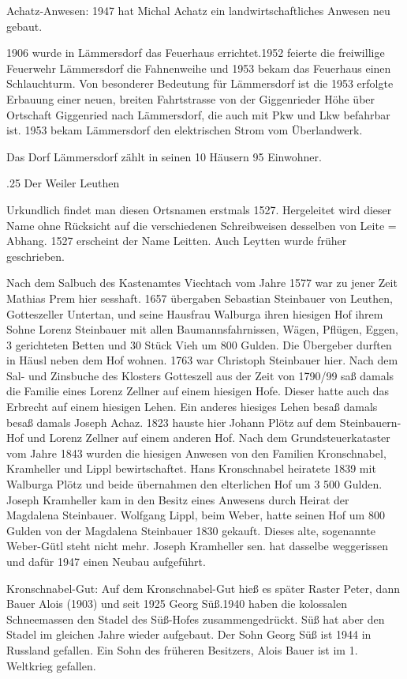 \documentclass{book}
\begin{document}
Achatz-Anwesen: 1947 hat Michal Achatz ein landwirtschaftliches Anwesen neu
gebaut.

1906 wurde in Lämmersdorf das Feuerhaus errichtet.1952 feierte die freiwillige
Feuerwehr Lämmersdorf die Fahnenweihe und 1953 bekam das Feuerhaus einen
Schlauchturm. Von besonderer Bedeutung für Lämmersdorf ist die 1953 erfolgte
Erbauung einer neuen, breiten Fahrtstrasse von der Giggenrieder Höhe über
Ortschaft Giggenried nach Lämmersdorf, die auch mit Pkw und Lkw befahrbar ist.
1953 bekam Lämmersdorf den elektrischen Strom vom Überlandwerk.

Das Dorf Lämmersdorf zählt in seinen 10 Häusern 95 Einwohner.

.25 Der Weiler Leuthen

Urkundlich findet man diesen Ortsnamen erstmals 1527. Hergeleitet wird dieser
Name ohne Rücksicht auf die verschiedenen Schreibweisen desselben von Leite =
Abhang. 1527 erscheint der Name Leitten. Auch Leytten wurde früher geschrieben.

Nach dem Salbuch des Kastenamtes Viechtach vom Jahre 1577 war zu jener Zeit
Mathias Prem hier sesshaft. 1657 übergaben Sebastian Steinbauer von Leuthen,
Gotteszeller Untertan, und seine Hausfrau Walburga ihren hiesigen Hof ihrem
Sohne Lorenz Steinbauer mit allen Baumannsfahrnissen, Wägen, Pflügen, Eggen, 3
gerichteten Betten und 30 Stück Vieh um 800 Gulden. Die Übergeber durften in
Häusl neben dem Hof wohnen. 1763 war Christoph Steinbauer hier. Nach dem Sal-
und Zinsbuche des Klosters Gotteszell aus der Zeit von 1790/99 saß damals die
Familie eines Lorenz Zellner auf einem hiesigen Hofe. Dieser hatte auch das
Erbrecht auf einem hiesigen Lehen. Ein anderes hiesiges Lehen besaß damals besaß
damals Joseph Achaz. 1823 hauste hier Johann Plötz auf dem Steinbauern-Hof und
Lorenz Zellner auf einem anderen Hof. Nach dem Grundsteuerkataster vom Jahre
1843 wurden die hiesigen Anwesen von den Familien Kronschnabel, Kramheller und
Lippl bewirtschaftet. Hans Kronschnabel heiratete 1839 mit Walburga Plötz und
beide übernahmen den elterlichen Hof um 3 500 Gulden. Joseph Kramheller kam in
den Besitz eines Anwesens durch Heirat der Magdalena Steinbauer. Wolfgang Lippl,
beim Weber, hatte seinen Hof um 800 Gulden von der Magdalena Steinbauer 1830
gekauft. Dieses alte, sogenannte Weber-Gütl steht nicht mehr. Joseph Kramheller
sen. hat dasselbe weggerissen und dafür 1947 einen Neubau aufgeführt.

Kronschnabel-Gut: Auf dem Kronschnabel-Gut hieß es später Raster Peter, dann
Bauer Alois (1903) und seit 1925 Georg Süß.1940 haben die kolossalen
Schneemassen den Stadel des Süß-Hofes zusammengedrückt. Süß hat aber den Stadel
im gleichen Jahre wieder aufgebaut. Der Sohn Georg Süß ist 1944 in Russland
gefallen. Ein Sohn des früheren Besitzers, Alois Bauer ist im 1. Weltkrieg
gefallen.
\end{document}
